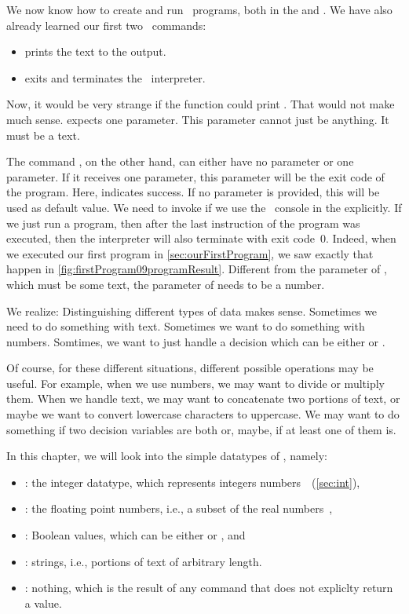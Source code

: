 %
%
We now know how to create and run \python\ programs, both in the  and .
We have also already learned our first two \python\ commands:%
%
\begin{itemize}%
\item {} prints the text  to the output.
\item {} exits and terminates the \python\ interpreter.%
\end{itemize}%
%
Now, it would be very strange if the  function could print .
That would not make much sense.
 expects one parameter.
This parameter cannot just be anything.
It must be a text.

The command , on the other hand, can either have no parameter or one parameter.
If it receives one parameter, this parameter will be the exit code of the program.
Here,  indicates success.
If no parameter is provided, this will be used as default value.
We need to invoke  if we use the \python\ console in the  explicitly.
If we just run a program, then after the last instruction of the program was executed, then the interpreter will also terminate with exit code~0.
Indeed, when we executed our first program in \cref{sec:ourFirstProgram}, we saw exactly that happen in \cref{fig:firstProgram09programResult}.
Different from the parameter of , which must be some text, the parameter of  needs to be a number.

We realize:
Distinguishing different types of data makes sense.
Sometimes we need to do something with text.
Sometimes we want to do something with numbers.
Somtimes, we want to just handle a decision which can be either  or .

Of course, for these different situations, different possible operations may be useful.
For example, when we use numbers, we may want to divide or multiply them.
When we handle text, we may want to concatenate two portions of text, or maybe we want to convert lowercase characters to uppercase.
We may want to do something if two decision variables are both  or, maybe, if at least one of them is.

In this chapter, we will look into the simple datatypes of \python, namely:%
%
\begin{itemize}%
%
\item {}: the integer datatype, which represents integers numbers~\integerNumbers~(\cref{sec:int}),%
\item {}: the floating point numbers, i.e., a subset of the real numbers~\realNumbers,%
\item {}: Boolean values, which can be either  or , and%
\item {}: strings, i.e., portions of text of arbitrary length.%
\item {}: nothing, which is the result of any command that does not expliclty return a value.%
%
\end{itemize}%
%
\endhsection%
%
